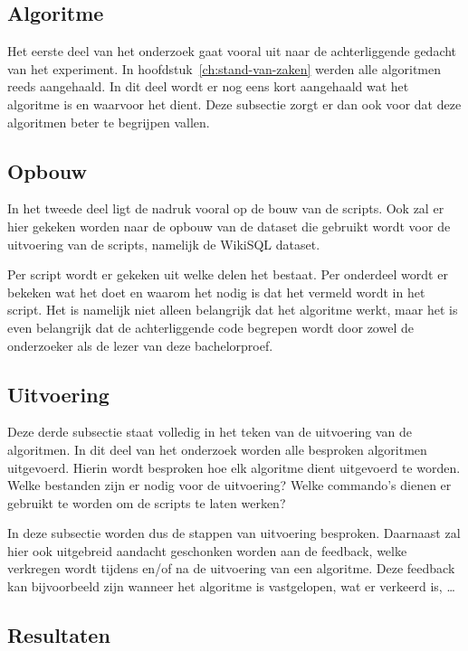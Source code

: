 \subsection{Algoritme}

Het eerste deel van het onderzoek gaat vooral uit naar de achterliggende gedacht van het experiment. In hoofdstuk~\ref{ch:stand-van-zaken} werden alle algoritmen reeds aangehaald. In dit deel wordt er nog eens kort aangehaald wat het algoritme is en waarvoor het dient. Deze subsectie zorgt er dan ook voor dat deze algoritmen beter te begrijpen vallen. 

\subsection{Opbouw}

In het tweede deel ligt de nadruk vooral op de bouw van de scripts. Ook zal er hier gekeken worden naar de opbouw van de dataset die gebruikt wordt voor de uitvoering van de scripts, namelijk de WikiSQL dataset. 

Per script wordt er gekeken uit welke delen het bestaat. Per onderdeel wordt er bekeken wat het doet en waarom het nodig is dat het vermeld wordt in het script. Het is namelijk niet alleen belangrijk dat het algoritme werkt, maar het is even belangrijk dat de achterliggende code begrepen wordt door zowel de onderzoeker als de lezer van deze bachelorproef.

\subsection{Uitvoering}

Deze derde subsectie staat volledig in het teken van de uitvoering van de algoritmen. In dit deel van het onderzoek worden alle besproken algoritmen uitgevoerd. Hierin wordt besproken hoe elk algoritme dient uitgevoerd te worden. Welke bestanden zijn er nodig voor de uitvoering? Welke commando's dienen er gebruikt te worden om de scripts te laten werken? 

In deze subsectie worden dus de stappen van uitvoering besproken. Daarnaast zal hier ook uitgebreid aandacht geschonken worden aan de feedback, welke verkregen wordt tijdens en/of na de uitvoering van een algoritme. Deze feedback kan bijvoorbeeld zijn wanneer het algoritme is vastgelopen, wat er verkeerd is, \dots 

\subsection{Resultaten}

